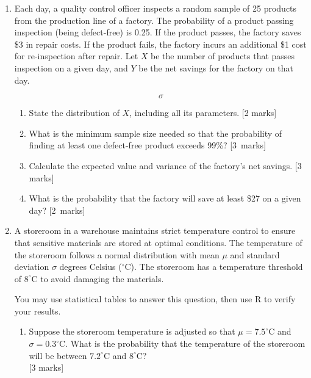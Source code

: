 \begin{enumerate}
\begin{enumerate}
\end{enumerate}

\vspace{0.5cm}

\item Each day, a quality control officer inspects a random sample of 25 products from the production line of a factory. The probability of a product passing inspection (being defect-free) is 0.25. If the product passes, the factory saves \$3 in repair costs. If the product fails, the factory incurs an additional \$1 cost for re-inspection after repair.
Let $X$ be the number of products that passes inspection on a given day, and $Y$ be the net savings for the factory on that day.

\[
\sigma
\]

\begin{enumerate}
\item State the distribution of $X$, including all its parameters.
	\hfill [2 marks]

%
\item What is the minimum sample size needed so that the probability of finding at least one defect-free product exceeds 99\%?
	\hfill [3~marks]

%
\item Calculate the expected value and variance of the factory's net savings.
	\hfill [3 marks]

\item What is the probability that the factory will save at least \$27 on a given day?
	\hfill [2~marks]

\end{enumerate}

\vspace{0.5cm}

\item A storeroom in a warehouse maintains strict temperature control to ensure that sensitive materials are stored at optimal conditions. The temperature of the storeroom follows a normal distribution with mean $\mu$ and standard deviation $\sigma$ degrees Celsius ($^{\circ}$C). The storeroom has a temperature threshold of $8^\circ$C to avoid damaging the materials.

You may use statistical tables to answer this question, then use \textsf{R} to verify your results.

\begin{enumerate}
\item Suppose the storeroom temperature is adjusted so that $\mu = 7.5^\circ$C and $\sigma = 0.3^\circ$C. What is the probability that the temperature of the storeroom will be between $7.2^\circ$C and $8^\circ$C?
	\\\phantom{1} \hfill [3 marks]


\end{enumerate}
\end{enumerate}
